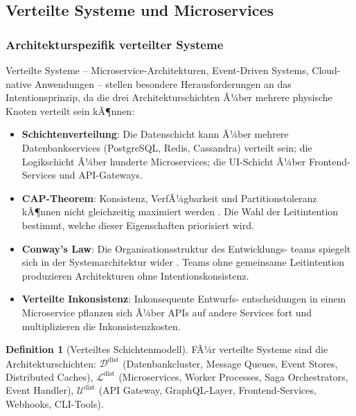 ﻿\documentclass[a4paper,12pt]{article}
\theoremstyle{definition}
\newtheorem{definition}{Definition}
\begin{document}
\subsection{Verteilte Systeme und Microservices}

\subsubsection{Architekturspezifik verteilter Systeme}

Verteilte Systeme -- Microservice-Architekturen, Event-Driven Systems,
Cloud-native Anwendungen -- stellen besondere Herausforderungen an das
Intentionsprinzip, da die drei Architekturschichten Ã¼ber mehrere physische
Knoten verteilt sein kÃ¶nnen:

\begin{itemize}
    \item \textbf{Schichtenverteilung}: Die Datenschicht kann Ã¼ber mehrere
          Datenbankservices (PostgreSQL, Redis, Cassandra) verteilt sein;
          die Logikschicht Ã¼ber hunderte Microservices; die UI-Schicht Ã¼ber
          Frontend-Services und API-Gateways.
    \item \textbf{CAP-Theorem}: Konsistenz, VerfÃ¼gbarkeit und
          Partitionstoleranz kÃ¶nnen nicht gleichzeitig maximiert werden
          \cite{brewer2000cap}. Die Wahl der Leitintention bestimmt, welche
          dieser Eigenschaften priorisiert wird.
    \item \textbf{Conway's Law}: Die Organisationsstruktur des Entwicklungs-
          teams spiegelt sich in der Systemarchitektur wider \cite{conway1968}.
          Teams ohne gemeinsame Leitintention produzieren Architekturen ohne
          Intentionskonsistenz.
    \item \textbf{Verteilte Inkonsistenz}: Inkonsequente Entwurfs-
          entscheidungen in einem Microservice pflanzen sich Ã¼ber APIs auf
          andere Services fort und multiplizieren die Inkonsistenzkosten.
\end{itemize}

\begin{definition}[Verteiltes Schichtenmodell]
FÃ¼r verteilte Systeme sind die Architekturschichten:
$\mathcal{D}^{\text{dist}}$ (Datenbankcluster, Message Queues, Event
Stores, Distributed Caches),
$\mathcal{L}^{\text{dist}}$ (Microservices, Worker Processes, Saga
Orchestrators, Event Handler),
$\mathcal{U}^{\text{dist}}$ (API Gateway, GraphQL-Layer, Frontend-Services,
Webhooks, CLI-Tools).
\end{definition}
\end{document}

